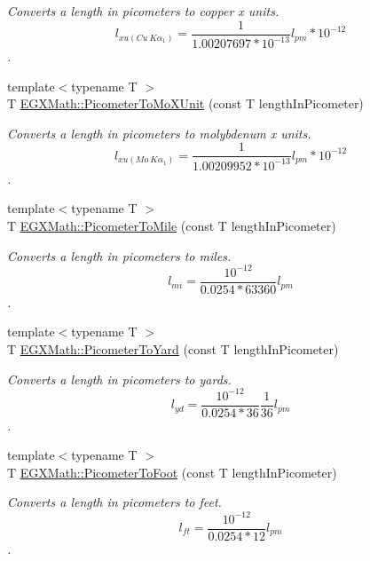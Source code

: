 \begin{DoxyCompactItemize}
\begin{DoxyCompactList}\small\item\em Converts a length in picometers to copper x units. \[ l_{xu(Cu\ K\alpha_1)}= \frac{1}{1.00207697*10^{-13}} l_{pm} * 10^{-12}\]. \end{DoxyCompactList}\item 
{\footnotesize template$<$typename T $>$ }\\T \mbox{\hyperlink{group___e_g_x_math-_conversions-_length_conversions-_s_i-_picometer-_non-_s_i_ga51b96b4bb30b7e9c971db81ff89a82f8}{E\+G\+X\+Math\+::\+Picometer\+To\+Mo\+X\+Unit}} (const T length\+In\+Picometer)
\begin{DoxyCompactList}\small\item\em Converts a length in picometers to molybdenum x units. \[ l_{xu(Mo\ K\alpha_1)}=\frac{1}{1.00209952*10^{-13}} l_{pm} * 10^{-12}\]. \end{DoxyCompactList}\item 
{\footnotesize template$<$typename T $>$ }\\T \mbox{\hyperlink{group___e_g_x_math-_conversions-_length_conversions-_s_i-_picometer-_imperial_gae153bd94c8377dd95b8b09bcc56256b0}{E\+G\+X\+Math\+::\+Picometer\+To\+Mile}} (const T length\+In\+Picometer)
\begin{DoxyCompactList}\small\item\em Converts a length in picometers to miles. \[ l_{mi}=\frac{10^{-12}}{0.0254 * 63360} l_{pm} \]. \end{DoxyCompactList}\item 
{\footnotesize template$<$typename T $>$ }\\T \mbox{\hyperlink{group___e_g_x_math-_conversions-_length_conversions-_s_i-_picometer-_imperial_ga18b17a118ffb1092beefc221f44a97a2}{E\+G\+X\+Math\+::\+Picometer\+To\+Yard}} (const T length\+In\+Picometer)
\begin{DoxyCompactList}\small\item\em Converts a length in picometers to yards. \[ l_{yd}= \frac{10^{-12}}{0.0254 * 36} \frac{1}{36} l_{pm} \]. \end{DoxyCompactList}\item 
{\footnotesize template$<$typename T $>$ }\\T \mbox{\hyperlink{group___e_g_x_math-_conversions-_length_conversions-_s_i-_picometer-_imperial_gae83808c99fe5c49c54717302f667ff46}{E\+G\+X\+Math\+::\+Picometer\+To\+Foot}} (const T length\+In\+Picometer)
\begin{DoxyCompactList}\small\item\em Converts a length in picometers to feet. \[ l_{ft}= \frac{10^{-12}}{0.0254 * 12} l_{pm} \]. \end{DoxyCompactList}\item 

\end{DoxyCompactItemize}
